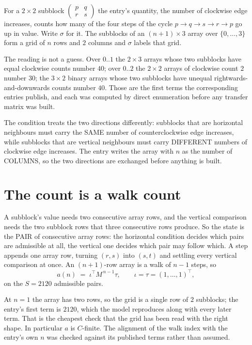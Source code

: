 \documentclass[11pt,a4paper]{article}
\theoremstyle{plain}
\theoremstyle{definition}
\begin{document}
For a $2\times2$ subblock $\begin{pmatrix}p&q\\r&s\end{pmatrix}$ the
entry's quantity, the number of clockwise edge increases, counts how many of the four steps of the cycle $p\to q\to s\to r\to p$ go up in value. Write $\sigma$ for it. The subblocks of an
$(n+1)\times3$ array over $\{0,\dots,3\}$ form a grid of $n$ rows and $2$
columns and $\sigma$ labels that grid.

The reading is not a guess. Over $0..1$ the $2\times3$ arrays whose two subblocks have equal
clockwise counts number $40$; over $0..2$ the $2\times2$ arrays of clockwise count $2$ number
$30$; the $3\times2$ binary arrays whose two subblocks have unequal rightwards-and-downwards
counts number $40$. Those are the first terms the corresponding entries publish, and each was
computed by direct enumeration before any transfer matrix was built.

The condition treats the two directions differently: subblocks that are horizontal neighbours
must carry the SAME number of counterclockwise edge increases, while subblocks that are vertical neighbours must carry
DIFFERENT numbers of clockwise edge increases. The entry writes the array with $n$ as the number of COLUMNS, so the two directions are exchanged before anything is built.

\section{The count is a walk count}

A subblock's value needs two consecutive array rows, and the vertical
comparison needs the two subblock rows that three consecutive rows produce. So the state is the
PAIR of consecutive array rows: the horizontal condition decides which pairs are admissible at
all, the vertical one decides which pair may follow which. A step appends one array row,
turning $(r,s)$ into $(s,t)$ and settling every vertical comparison at once. An $(n+1)$-row
array is a walk of $n-1$ steps, so
\[
a(n)\;=\;\iota^{\!\top}M^{\,n-1}\tau,\qquad\iota=\tau=(1,\dots,1)^{\!\top},
\]
on the $S=2120$ admissible pairs.

At $n=1$ the array has two rows, so the grid is a single row of $2$
subblocks; the entry's first term is $2120$, which the model
reproduces along with every later term. That is the cheapest check that the grid has been read
with the right shape.
In particular $a$ is $C$-finite. The alignment of the walk index with the entry's own $n$ was
checked against its published terms rather than assumed.
\end{document}
